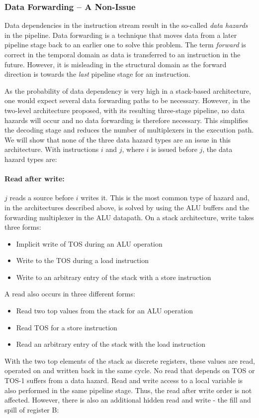 \subsubsection{Data Forwarding -- A Non-Issue}

Data dependencies in the instruction stream result in the so-called
\emph{data hazards} \cite{Hennessy02} in the pipeline. Data
forwarding is a technique that moves data from a later pipeline
stage back to an earlier one to solve this problem. The term
\emph{forward} is correct in the temporal domain as data is
transferred to an instruction in the future. However, it is
misleading in the structural domain as the forward direction is
towards the \emph{last} pipeline stage for an instruction.

As the probability of data dependency is very high in a stack-based
architecture, one would expect several data forwarding paths to be
necessary. However, in the two-level architecture proposed, with its
resulting three-stage pipeline, no data hazards will occur and no
data forwarding is therefore necessary. This simplifies the decoding
stage and reduces the number of multiplexers in the execution path.
We will show that none of the three data hazard types
\cite{Hennessy02} are an issue in this architecture. With
instructions $i$ and $j$, where $i$ is issued before $j$, the data
hazard types are:

\paragraph{Read after write:} $j$ reads a source before $i$ writes it. This
is the most common type of hazard and, in the architectures
described above, is solved by using the ALU buffers and the
forwarding multiplexer in the ALU datapath. On a stack architecture,
write takes three forms:
%
\begin{itemize}
    \item Implicit write of TOS during an ALU operation
    \item Write to the TOS during a load instruction
    \item Write to an arbitrary entry of the stack with a store instruction
\end{itemize}
%
A read also occurs in three different forms:
\begin{itemize}
    \item Read two top values from the stack for an ALU operation
    \item Read TOS for a store instruction
    \item Read an arbitrary entry of the stack with the load instruction
\end{itemize}
%
With the two top elements of the stack as discrete registers, these
values are read, operated on and written back in the same cycle. No
read that depends on TOS or TOS-1 suffers from a data hazard. Read
and write access to a local variable is also performed in the same
pipeline stage. Thus, the read after write order is not affected.
However, there is also an additional hidden read and write - the
fill and spill of register B:



